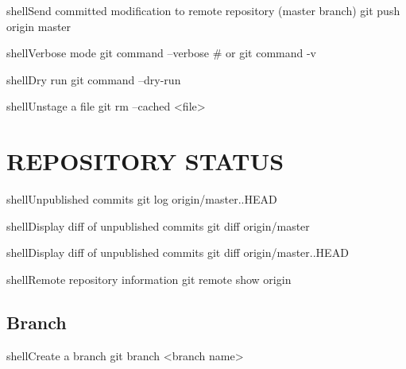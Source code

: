 \documentclass[10pt,a4paper]{article}
\begin{document}
\begin{multicols}{3}
\begin{codebox}{shell}{Send committed modification to remote repository (master branch)}
git push origin master

\end{codebox}

\begin{codebox}{shell}{Verbose mode}
git command --verbose
# or 
git command -v

\end{codebox}

\begin{codebox}{shell}{Dry run}
git command --dry-run

\end{codebox}

\begin{codebox}{shell}{Unstage a file}
git rm --cached <file>

\end{codebox}

{\centering\section{REPOSITORY STATUS}}

\begin{codebox}{shell}{Unpublished commits}
git log origin/master..HEAD

\end{codebox}

\begin{codebox}{shell}{Display diff of unpublished commits}
git diff origin/master

\end{codebox}

\begin{codebox}{shell}{Display diff of unpublished commits}
git diff origin/master..HEAD

\end{codebox}

\begin{codebox}{shell}{Remote repository information}
git remote show origin

\end{codebox}

\subsection{Branch}

\begin{codebox}{shell}{Create a branch}
git branch <branch name>


\end{codebox}
\end{multicols}
\end{document}
